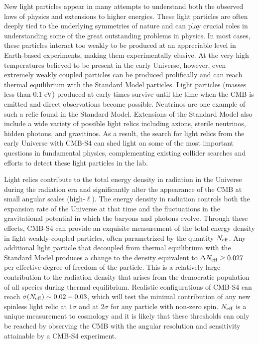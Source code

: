 New light particles appear in many attempts to understand both the observed laws of physics and extensions to higher energies.  These light particles are often deeply tied to the underlying symmetries of nature and can play crucial roles in understanding some of the great outstanding problems in physics.  In most cases, these particles interact too weakly to be produced at an appreciable level in Earth-based experiments, making them experimentally elusive.  At the very high temperatures believed to be present in the early Universe, however, even extremely weakly coupled particles can be produced prolifically and can reach thermal equilibrium with the Standard Model particles. Light particles (masses less than $0.1$ eV) produced at early times survive until the time when the CMB is emitted and direct observations become possible.  Neutrinos are one example of such a relic found in the Standard Model.  Extensions of the Standard Model also include a wide variety of possible light relics including axions, sterile neutrinos, hidden photons, and gravitinos.  As a result, the search for light relics from the early Universe with CMB-S4 can shed light on some of the most important questions in fundamental physics, complementing existing collider searches and efforts to detect these light particles in the lab.  
 
Light relics contribute to the total energy density in radiation in the Universe during the radiation era and significantly alter the appearance of the CMB at small angular scales (high-$\ell$). The energy density in radiation controls both the expansion rate of the Universe at that time and the fluctuations in the gravitational potential in which the baryons and photons evolve.  Through these effects, CMB-S4 can provide an exquisite measurement of the total energy density in light weakly-coupled particles, often parametrized by the quantity $N_{\rm eff}$.  Any additional light particle that decoupled from thermal equilibrium with the Standard Model produces a change to the density equivalent to $\Delta N_{\rm eff} \geq 0.027$ per effective degree of freedom of the particle.  This is a relatively large contribution to the radiation density that arises from the democratic population of all species during thermal equilibrium.  Realistic configurations of CMB-S4 can reach $\sigma(N_{\rm eff}) \sim 0.02-0.03$, which will test the minimal contribution of any new spinless light relic at $1\sigma$ and at 2$\sigma$ for any particle with non-zero spin.  $N_{\rm eff}$ is a unique measurement to cosmology and it is likely that these thresholds can only be reached by observing the CMB with the angular resolution and sensitivity attainable by a CMB-S4 experiment.   


